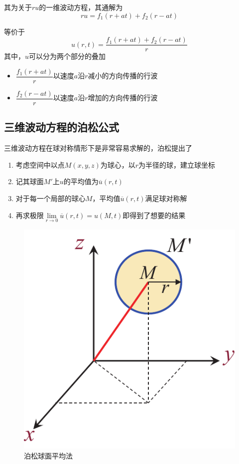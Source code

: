	其为关于$ru$的一维波动方程，其通解为
	\begin{equation}
		ru = f_1(r+at) + f_2(r-at)
	\end{equation}

	等价于
	\begin{equation}
		u(r,t) = \dfrac{f_1(r+at) + f_2(r-at)}{r}
	\end{equation}
	其中，$u$可以分为两个部分的叠加
	\begin{itemize}
		\item $\dfrac{f_1(r+at)}{r}$\quad 以速度$a$沿$r$减小的方向传播的行波
		\item $\dfrac{f_2(r-at)}{r}$\quad 以速度$a$沿$r$增加的方向传播的行波
	\end{itemize}


\subsection{三维波动方程的泊松公式}
	三维波动方程在球对称情形下是非常容易求解的，泊松提出了
	\begin{enumerate}[\hspace*{3em} 1. ]
		\item 考虑空间中以点$M(x,y,z)$为球心，以$r$为半径的球，建立球坐标
		\item 记其球面$M'$上$u$的平均值为$\overline{u}(r,t)$
		\item 对于每一个局部的球心$M$，平均值$\overline{u}(r,t)$满足球对称解
		\item 再求极限$\lim\limits_{r \to 0} \overline{u}(r,t) = u(M, t)$即得到了想要的结果
	\end{enumerate}

\begin{figure}[!htb]
	\centering
	\vspace*{-1em}
	\includegraphics[width=0.25\linewidth]{pic/泊松球面平均法.pdf}
	\vspace*{-1em}
	\caption{泊松球面平均法}
	\label{泊松球面平均法}
\end{figure}

